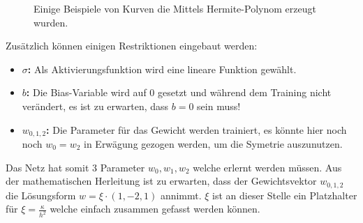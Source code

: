 \begin{figure}
	\centering
	
	\label{fig:mst_neuronalnetworkdemo}
	\caption{Einige Beispiele von Kurven die Mittels Hermite-Polynom erzeugt wurden.}
\end{figure}

Zusätzlich können einigen Restriktionen eingebaut werden:
\begin{itemize}
	\item {\textbf{$\sigma$:} Als Aktivierungsfunktion wird eine lineare Funktion gewählt.}
	\item {\textbf{$b$: } Die Bias-Variable wird auf 0 gesetzt und während dem Training nicht verändert, es ist zu erwarten, dass $b=0$ sein muss!}
	\item {\textbf{$w_{0,1,2}$: } Die Parameter für das Gewicht werden trainiert, es könnte hier noch noch $w_0 = w_2$ in Erwägung gezogen werden, um die Symetrie auszunutzen.}
\end{itemize}
Das Netz hat somit 3 Parameter $w_0, w_1, w_2$ welche erlernt werden müssen. Aus der mathematischen Herleitung ist zu erwarten, dass der Gewichtsvektor $w_{0,1,2}$ die Lösungsform $w = \xi \cdot (1, -2, 1)$ annimmt. $\xi$ ist an dieser Stelle ein Platzhalter für $\xi = \frac{\kappa}{h^{2}}$ welche einfach zusammen gefasst werden können.

